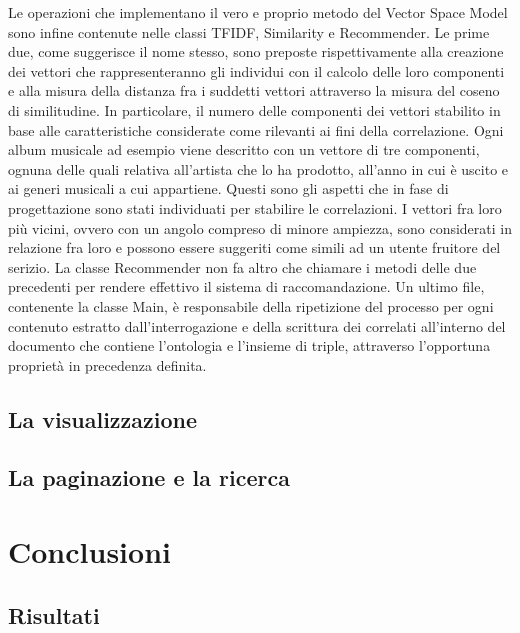 \documentclass[Lau,binding=0.6cm,noexaminfo,oneside]{sapthesis}
\newcommand{\insertcode}[1]{}
\begin{document}
Le operazioni che implementano il vero e proprio metodo del Vector Space Model sono infine contenute nelle classi TFIDF, Similarity e Recommender. Le prime due, come suggerisce il nome stesso, sono preposte rispettivamente alla creazione dei vettori che rappresenteranno gli individui con il calcolo delle loro componenti e alla misura della distanza fra i suddetti vettori attraverso la misura del coseno di similitudine. In particolare, il numero delle componenti dei vettori  stabilito in base alle caratteristiche considerate come rilevanti ai fini della correlazione. Ogni album musicale ad esempio viene descritto con un vettore di tre componenti, ognuna delle quali relativa all'artista che lo ha prodotto, all'anno in cui è uscito e ai generi musicali a cui appartiene. Questi sono gli aspetti che in fase di progettazione sono stati individuati per stabilire le correlazioni. I vettori fra loro più vicini, ovvero con un angolo compreso di minore ampiezza, sono considerati in relazione fra loro e possono essere suggeriti come simili ad un utente fruitore del serizio. La classe Recommender non fa altro che chiamare i metodi delle due precedenti per rendere effettivo il sistema di raccomandazione. Un ultimo file, contenente la classe Main, è responsabile della ripetizione del processo per ogni contenuto estratto dall'interrogazione e della scrittura dei correlati all'interno del documento che contiene l'ontologia e l'insieme di triple, attraverso l'opportuna proprietà in precedenza definita.

\section{La visualizzazione}



\section{La paginazione e la ricerca}




\chapter{Conclusioni}
\section{Risultati}

\end{document}
